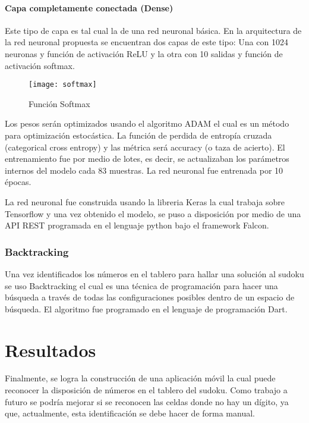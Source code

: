 \documentclass{article}
\begin{document}
\paragraph{Capa completamente conectada (Dense)} Este tipo de capa es tal cual la de una red neuronal b\'asica. En la arquitectura de la red neuronal propuesta se encuentran dos capas de este tipo: Una con 1024 neuronas y funci\'on de activaci\'on ReLU y la otra con 10 salidas y funci\'on de activaci\'on softmax.
\begin{figure}[H]
  \caption{Funci\'on Softmax}
  \centering 
  \texttt{[image: softmax]}
\end{figure}

Los pesos ser\'an optimizados usando el algoritmo ADAM el cual es un m\'etodo para optimizaci\'on estoc\'astica. La funci\'on de perdida de entrop\'ia cruzada (categorical cross entropy) y las m\'etrica ser\'a accuracy (o taza de acierto).
El entrenamiento fue por medio de lotes, es decir, se actualizaban los par\'ametros internos del modelo cada 83 muestras. La red neuronal fue entrenada por 10 \'epocas.

La red neuronal fue construida usando la libreria Keras la cual trabaja sobre Tensorflow y una vez obtenido el modelo, se puso a disposici\'on por medio de una API REST programada en el lenguaje python bajo el framework Falcon.
\subsubsection{Backtracking}
Una vez identificados los n\'umeros en el tablero para hallar una soluci\'on al sudoku se uso Backtracking el cual es una t\'ecnica de programaci\'on para hacer una b\'usqueda a trav\'es de todas las configuraciones posibles dentro de un espacio de b\'usqueda.
El algoritmo fue programado en el lenguaje de programaci\'on Dart.
\section{Resultados}
Finalmente, se logra la construcci\'on de una aplicaci\'on m\'ovil la cual puede reconocer la disposici\'on de n\'umeros en el tablero del sudoku.
Como trabajo a futuro se podr\'ia mejorar  si se reconocen las celdas donde no hay un d\'igito, ya que, actualmente, esta identificaci\'on se debe hacer de forma manual.


    
\end{document}
